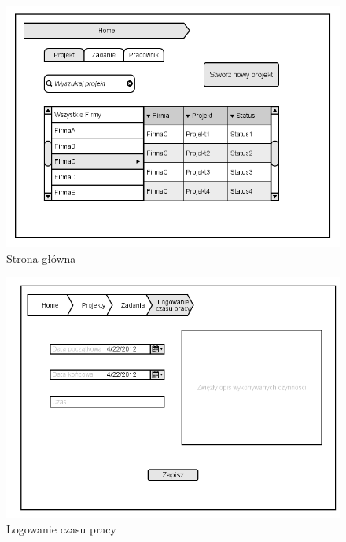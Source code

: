 \begin{figure}[H]
    \centering
    \includegraphics[scale=0.7]{diagramy/intefejsy/Home.png}
    \caption{Strona główna}
    \label{fig:usecase}
\end{figure}


\begin{figure}[H]
    \centering
    \includegraphics[scale=0.7]{diagramy/intefejsy/Logowanie_czasu_pracy.png}
    \caption{Logowanie czasu pracy}
    \label{fig:usecase}
\end{figure}

